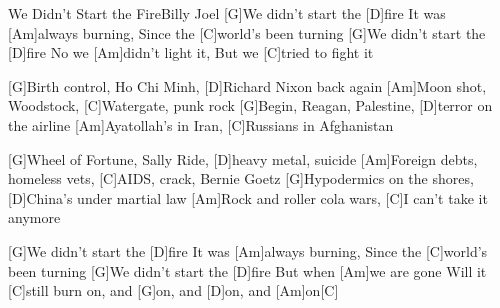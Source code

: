 \documentclass[../main.tex]{subfiles}
\begin{document}
\begin{song}{We Didn't Start the Fire}{Billy Joel}{}
[G]We didn't start the [D]fire
It was [Am]always burning,
Since the [C]world's been turning
[G]We didn't start the [D]fire
No we [Am]didn't light it,
But we [C]tried to fight it

[G]Birth control, Ho Chi Minh, [D]Richard Nixon back again
[Am]Moon shot, Woodstock, [C]Watergate, punk rock
[G]Begin, Reagan, Palestine, [D]terror on the airline
[Am]Ayatollah's in Iran, [C]Russians in Afghanistan

[G]Wheel of Fortune, Sally Ride, [D]heavy metal, suicide
[Am]Foreign debts, homeless vets, [C]AIDS, crack, Bernie Goetz
[G]Hypodermics on the shores, [D]China's under martial law
[Am]Rock and roller cola wars, [C]I can't take it anymore

[G]We didn't start the [D]fire
It was [Am]always burning,
Since the [C]world's been turning
[G]We didn't start the [D]fire
But when [Am]we are gone
Will it [C]still burn on, and [G]on, and [D]on, and [Am]on[C]{\hh}
\end{song}
\end{document}
